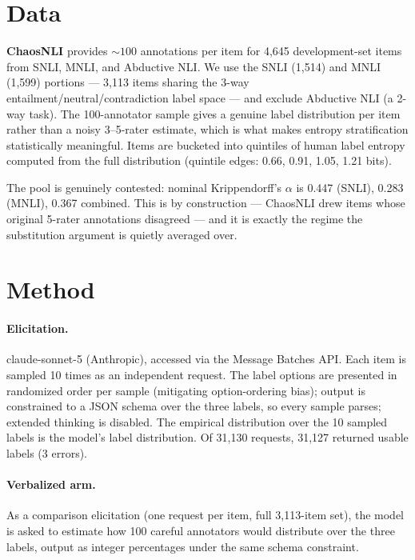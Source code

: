 \documentclass[11pt]{article}
\begin{document}
\section{Data}
\label{sec:data}

\textbf{ChaosNLI} \citep{nie2020chaosnli} provides ${\sim}100$ annotations per item for 4,645 development-set items from SNLI, MNLI, and Abductive NLI. We use the SNLI (1,514) and MNLI (1,599) portions --- 3,113 items sharing the 3-way entailment/neutral/contradiction label space --- and exclude Abductive NLI (a 2-way task). The 100-annotator sample gives a genuine label distribution per item rather than a noisy 3--5-rater estimate, which is what makes entropy stratification statistically meaningful. Items are bucketed into quintiles of human label entropy computed from the full distribution (quintile edges: 0.66, 0.91, 1.05, 1.21 bits).

The pool is genuinely contested: nominal Krippendorff's $\alpha$ is 0.447 (SNLI), 0.283 (MNLI), 0.367 combined. This is by construction --- ChaosNLI drew items whose original 5-rater annotations disagreed --- and it is exactly the regime the substitution argument is quietly averaged over.

\section{Method}
\label{sec:method}

\paragraph{Elicitation.} claude-sonnet-5 (Anthropic), accessed via the Message Batches API. Each item is sampled 10 times as an independent request. The label options are presented in randomized order per sample (mitigating option-ordering bias); output is constrained to a JSON schema over the three labels, so every sample parses; extended thinking is disabled. The empirical distribution over the 10 sampled labels is the model's label distribution. Of 31,130 requests, 31,127 returned usable labels (3 errors).

\paragraph{Verbalized arm.} As a comparison elicitation (one request per item, full 3,113-item set), the model is asked to estimate how 100 careful annotators would distribute over the three labels, output as integer percentages under the same schema constraint.
\end{document}
